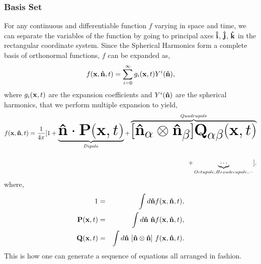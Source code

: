 \documentclass[onecolumn,12pt]{article}
\begin{document}
\subsubsection{Basis Set}
For any continuous and differentiable function $f$ varying in space and time, we can separate the variables of the function by going to principal axes ${\bf \hat{i}}$, ${\bf \hat{j}}$, ${\bf \hat{k}}$ in the rectangular coordinate system. Since the Spherical Harmonics form a complete basis of orthonormal functions,
$f$ can be expanded as,
\begin{equation}
f({\bf x},{\bf \hat{n}},t) = \sum_{i=0}^{\infty} g_i({\bf x},t) Y^i({\bf \hat{n}}), 
\end{equation}
where $g_i({\bf x},t)$ are the expansion coefficients and $Y^i({\bf \hat{n}})$ are the spherical harmonics, that we perform multiple expansion to yield, 
\begin{equation}
\begin{split}
f({\bf x},{\bf \hat{n}},t) = \frac{1}{4\pi} \Huge[1 + 
\underbrace{{\bf \hat{n}} \cdot {\bf P}({\bf x},t)}_{Dipole} 
+ \overbrace{[{\bf \hat{n}}_\alpha \otimes {\bf \hat{n}}_\beta] {\bf Q}_{\alpha\beta}({\bf x},t)}^{Quadrupole} \\
+ \underbrace{\cdots}_{Octupole, Hexadecapole, \cdots} \Huge].
\end{split}
\end{equation}
where, 
\begin{eqnarray}
1 &=& \int d{\bf \hat{n}} f({\bf x},{\bf \hat{n}},t), \\
{\bf P}({\bf x},t) &=& \int d{\bf \hat{n}}~ {\bf \hat{n}} f({\bf x},{\bf \hat{n}},t), \\
{\bf Q}({\bf x},t) &=& \int d{\bf \hat{n}}~ [{{\bf \hat{n}}\otimes{\bf \hat{n}}}] ~f({\bf x},{\bf \hat{n}},t).
\label{nemord}
\end{eqnarray} 
This is how one can generate a sequence of equations all arranged in fashion.
\end{document}
